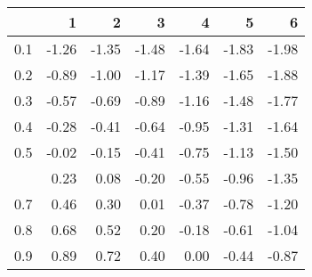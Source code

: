 
\begin{tabular}{lrrrrrr}
\toprule
  & 1 & 2 & 3 & 4 & 5 & 6\\
\midrule
0.1 & -1.26 & -1.35 & -1.48 & -1.64 & -1.83 & -1.98\\
0.2 & -0.89 & -1.00 & -1.17 & -1.39 & -1.65 & -1.88\\
0.3 & -0.57 & -0.69 & -0.89 & -1.16 & -1.48 & -1.77\\
0.4 & -0.28 & -0.41 & -0.64 & -0.95 & -1.31 & -1.64\\
0.5 & -0.02 & -0.15 & -0.41 & -0.75 & -1.13 & -1.50\\
\addlinespace
0.6 & 0.23 & 0.08 & -0.20 & -0.55 & -0.96 & -1.35\\
0.7 & 0.46 & 0.30 & 0.01 & -0.37 & -0.78 & -1.20\\
0.8 & 0.68 & 0.52 & 0.20 & -0.18 & -0.61 & -1.04\\
0.9 & 0.89 & 0.72 & 0.40 & 0.00 & -0.44 & -0.87\\
\bottomrule
\end{tabular}

